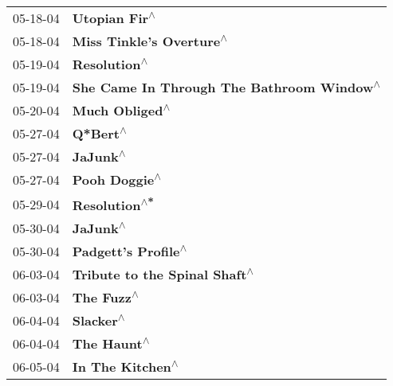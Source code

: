 \begin{supertabular}{p{0.25\columnwidth}p{0.75\columnwidth}}
 05-18-04 &                                                              \textbf{Utopian Fir\textsuperscript{$\wedge$}} \\
 05-18-04 &                                                   \textbf{Miss Tinkle's Overture\textsuperscript{$\wedge$}} \\
 05-19-04 &                                                               \textbf{Resolution\textsuperscript{$\wedge$}} \\
 05-19-04 &                                  \textbf{She Came In Through The Bathroom Window\textsuperscript{$\wedge$}} \\
 05-20-04 &                                                             \textbf{Much Obliged\textsuperscript{$\wedge$}} \\
 05-27-04 &                                                                   \textbf{Q*Bert\textsuperscript{$\wedge$}} \\
 05-27-04 &                                                                   \textbf{JaJunk\textsuperscript{$\wedge$}} \\
 05-27-04 &                                                              \textbf{Pooh Doggie\textsuperscript{$\wedge$}} \\
 05-29-04 &                                                              \textbf{Resolution\textsuperscript{$\wedge$*}} \\
 05-30-04 &                                                                   \textbf{JaJunk\textsuperscript{$\wedge$}} \\
 05-30-04 &                                                        \textbf{Padgett's Profile\textsuperscript{$\wedge$}} \\
 06-03-04 &                                              \textbf{Tribute to the Spinal Shaft\textsuperscript{$\wedge$}} \\
 06-03-04 &                                                                 \textbf{The Fuzz\textsuperscript{$\wedge$}} \\
 06-04-04 &                                                                  \textbf{Slacker\textsuperscript{$\wedge$}} \\
 06-04-04 &                                                                \textbf{The Haunt\textsuperscript{$\wedge$}} \\
 06-05-04 &                                                           \textbf{In The Kitchen\textsuperscript{$\wedge$}} \\

\end{supertabular}

